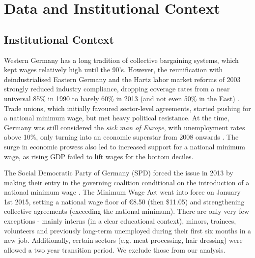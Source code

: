 \section{Data and Institutional Context} \label{chap:data}
\subsection{Institutional Context}
Western Germany has a long tradition of collective bargaining systems, which kept wages relatively high until the 90's. However, the reunification with  deindustrialised Eastern Germany and the Hartz labor market reforms of 2003 strongly reduced industry compliance, dropping coverage rates from a near universal 85\% in 1990 to barely 60\% in 2013 (and not even 50\% in the East) \citep{Weinkopf2015}. Trade unions, which initially favoured sector-level agreements, started pushing for a national minimum wage, but met heavy political resistance. At the time, Germany was still considered the \emph{sick man of Europe}, with unemployment rates above 10\%, only turning into an economic superstar from 2008 onwards \citep{Dustmann2014}. The surge in economic prowess also led to increased support for a national minimum wage, as rising GDP failed to lift wages for the bottom deciles.

The Social Democratic Party of Germany (SPD) forced the issue in 2013 by making their entry in the governing coalition conditional on the introduction of a national minimum wage \citep{Weinkopf2015}. The Minimum Wage Act went into force on January 1st 2015, setting a national wage floor of €8.50 (then \$11.05) and strengthening collective agreements (exceeding the national minimum). There are only very few exceptions - mainly interns (in a clear educational context), minors, trainees, volunteers and previously long-term unemployed during their first six months in a new job. Additionally, certain sectors (e.g. meat processing, hair dressing) were allowed a two year transition period. We exclude those from our analysis. 

